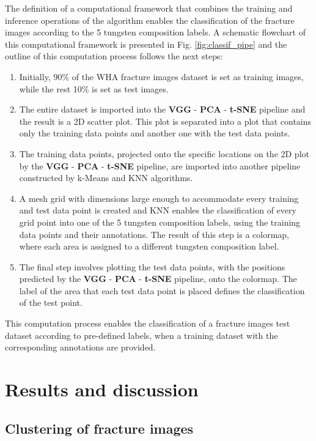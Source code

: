 \documentclass[authoryear,preprint,review,12pt, singleside]{elsarticle}
\begin{document}
The definition of a computational framework that combines the training and inference operations of the algorithm enables the classification of the fracture images according to the 5 tungsten composition labels.  A schematic flowchart of this computational framework is presented in Fig. \ref{fig:classif_pipe} and the outline of this computation process follows the next steps:

\begin{enumerate}
	\item Initially, 90\% of the WHA fracture images dataset is set as training images, while the rest 10\% is set as test images. 
	\item The entire dataset is imported into the \textbf{VGG} - \textbf{PCA} - \textbf{t-SNE} pipeline and the result is a 2D scatter plot. This plot is separated into a plot that contains only the training data points and another one with the test data points. 
	\item The training data points, projected onto the specific locations on the 2D plot by the \textbf{VGG} - \textbf{PCA} - \textbf{t-SNE} pipeline, are imported into another pipeline constructed by k-Means and KNN algorithms. 
	\item A mesh grid with dimensions large enough to accommodate every training and test data point is created and KNN enables the classification of every grid point into one of the 5 tungsten composition labels, using the training data points and their annotations. The result of this step is a colormap, where each area is assigned to a different tungsten composition label.
	\item The final step involves plotting the test data points, with the positions predicted by the \textbf{VGG} - \textbf{PCA} - \textbf{t-SNE} pipeline, onto the colormap. The label of the area that each test data point is placed defines the classification of the test point. 	
\end{enumerate}  


This computation process enables the classification of a fracture images test dataset according to pre-defined labels, when a training dataset with the corresponding annotations are provided. 


\section{Results and discussion}

\subsection{Clustering of fracture images}
\end{document}
